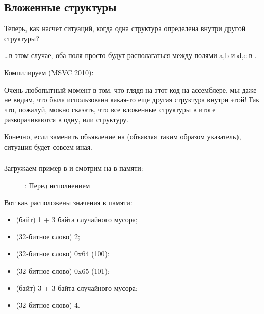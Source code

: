 \subsection{Вложенные структуры}

Теперь, как насчет ситуаций, когда одна структура определена внутри другой структуры?



\dots в этом случае, оба поля  просто будут располагаться между полями a,b и d,e в 
.

Компилируем (MSVC 2010):



Очень любопытный момент в том, что глядя на этот код на ассемблере, мы даже не видим, 
что была использована какая-то еще другая структура внутри этой!
Так что, пожалуй, можно сказать, что все вложенные структуры в итоге разворачиваются в одну,  
или  структуру.

Конечно, если заменить объявление  на  
(объявляя таким образом указатель), ситуация будет совсем иная.


\clearpage
\subsubsection{\olly}
\myindex{\olly}

Загружаем пример в \olly и смотрим на 
 в памяти:

\begin{figure}[H]
\centering
{}
\caption{\olly: Перед исполнением \printf}
\label{fig:nested_olly}
\end{figure}

Вот как расположены значения в памяти:
\begin{itemize}
\item {} (байт) 1 + 3 байта случайного мусора;
\item {} (32-битное слово) 2;
\item {} (32-битное слово) 0x64 (100);
\item {} (32-битное слово) 0x65 (101);
\item {} (байт) 3 + 3 байта случайного мусора;
\item {} (32-битное слово) 4.
\end{itemize}

